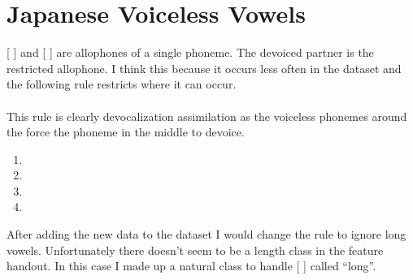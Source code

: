 \documentclass[20pt]{article}
\newcommand{\narrow}[1]{[ \textipa{#1} ]}
\begin{document}
\section{Japanese Voiceless Vowels}

\narrow{i \r*i} and \narrow{W \r*W} are allophones of a single phoneme. The
devoiced partner is the restricted allophone. I think this because it occurs
less often in the dataset and the following rule restricts where it can occur. \\

\phonb
  {}
  {}
  {}
  {} \\

This rule is clearly devocalization assimilation as the voiceless phonemes
around the force the phoneme in the middle to devoice.

\begin{enumerate}[label=\roman*.]
\item \narrow{\^ins\r*Wtanto}
\item \narrow{o\textphi\r*isW}
\item \narrow{Cop:iNgW}
\item \narrow{p\r*ikaso}
\end{enumerate}

After adding the new data to the dataset I would change the rule to ignore long
vowels. Unfortunately there doesn't seem to be a length class in the feature
handout. In this case I made up a natural class to handle \narrow{:} called ``long''. \\

\phonb
  {}
  {}
  {}
  {} \\

  
\end{document}
